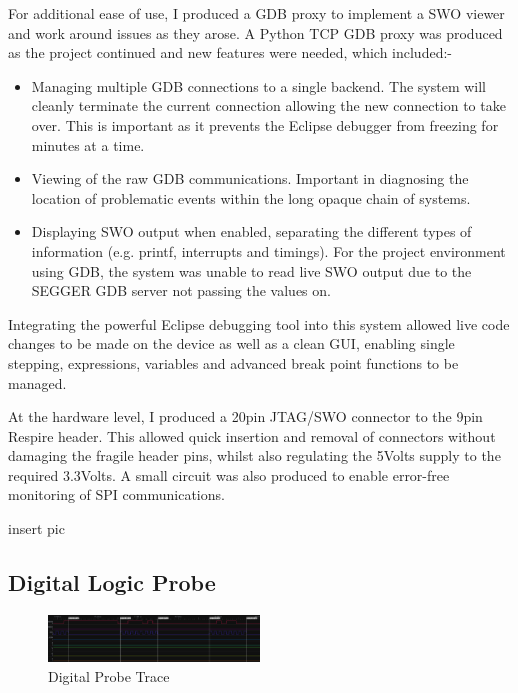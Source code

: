 For additional ease of use, I produced a GDB proxy to implement a SWO viewer and work around
issues as they arose. A Python TCP GDB proxy was produced as the project continued and new
features were needed, which included:-
\begin{itemize}
  \item Managing multiple GDB connections to a single backend. The system will cleanly terminate
        the current connection allowing the new connection to take over. This is important as it
        prevents the Eclipse debugger from freezing for minutes at a time.
  \item Viewing of the raw GDB communications. Important in diagnosing the location of
        problematic events within the long opaque chain of systems.
  \item Displaying SWO output when enabled, separating the different types of information (e.g.
        printf, interrupts and timings). For the project environment using GDB, the system was
        unable to read live SWO output due to the SEGGER GDB server not passing the values on.
\end{itemize}


Integrating the powerful Eclipse debugging tool into this system allowed live code changes to be
made on the device as well as a clean GUI, enabling single stepping, expressions, variables and
advanced break point functions to be managed.


At the hardware level, I produced a 20pin JTAG/SWO connector to the 9pin Respire header. This
allowed quick insertion and removal of connectors without damaging the fragile header pins, whilst
also regulating the 5Volts supply to the required 3.3Volts. A small circuit was also produced to
enable error-free monitoring of SPI communications.

{insert pic}


\subsection{Digital Logic Probe}

\begin{figure}
  \vspace{-10pt}
  \begin{center}
    \includegraphics[width=0.5\textwidth, keepaspectratio=true]{images/digital_probe.png}
  \end{center}
  \caption[Digital Probe Trace]{Digital Probe Trace}
  \vspace{-10pt}
\end{figure}

